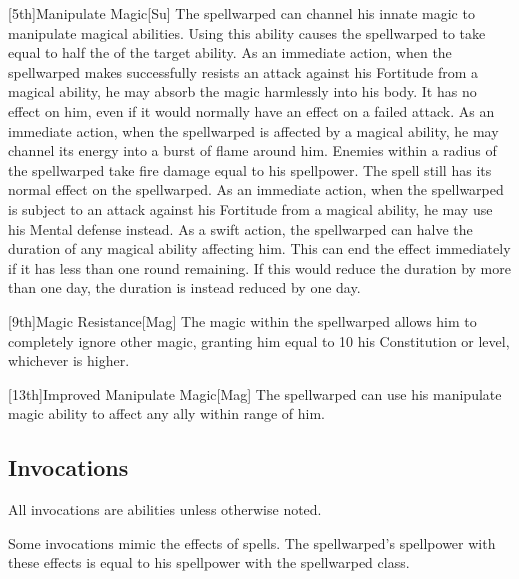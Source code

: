         [5th]{Manipulate Magic}[Su]
        The spellwarped can channel his innate magic to manipulate magical abilities.
        Using this ability causes the spellwarped to take  equal to half the  of the target ability.
        As an immediate action, when the spellwarped makes successfully resists an attack against his Fortitude from a magical ability, he may absorb the magic harmlessly into his body.
        It has no effect on him, even if it would normally have an effect on a failed attack.
        As an immediate action, when the spellwarped is affected by a magical ability, he may channel its energy into a burst of flame around him.
        Enemies within a \areamed radius of the spellwarped take fire damage equal to his spellpower.
        The spell still has its normal effect on the spellwarped.
        As an immediate action, when the spellwarped is subject to an attack against his Fortitude from a magical ability, he may use his Mental defense instead.
        As a swift action, the spellwarped can halve the duration of any magical ability affecting him.
        This can end the effect immediately if it has less than one round remaining.
        If this would reduce the duration by more than one day, the duration is instead reduced by one day.

        [9th]{Magic Resistance}[Mag]
        The magic within the spellwarped allows him to completely ignore other magic, granting him  equal to 10 \add his Constitution or level, whichever is higher.

        [13th]{Improved Manipulate Magic}[Mag]
        The spellwarped can use his manipulate magic ability to affect any ally within \rngmed range of him.

    \subsection{Invocations}\label{Invocations}

        All invocations are  abilities unless otherwise noted.

        Some invocations mimic the effects of spells.
        The spellwarped's spellpower with these effects is equal to his spellpower with the spellwarped class.


